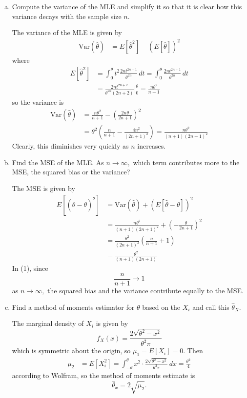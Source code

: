 \documentclass{article}
\newcommand{\var}{\mathrm{Var}}
\begin{document}
\begin{enumerate}
\begin{enumerate}[(a)]
			\item Compute the variance of the MLE and simplify it so that it is clear how this variance decays with the sample size $n.$
				\begin{soln}
					The variance of the MLE is given by 
					\begin{align*}
						\var(\hat{\theta}) &= E[\hat{\theta}^2]-(E[\hat{\theta}])^2 
					\end{align*} where 
					\begin{align*}
						E[\hat{\theta}^2] &= \int_0^\theta t^2 \frac{2nt^{2n-1}}{\theta^{2n}}\, dt = \int_0^\theta \frac{2nt^{2n+1}}{\theta^{2n}}\, dt \\
						&= \frac{2nt^{2n+2}}{\theta^{2n}(2n+2)}\bigg\vert_0^\theta = \frac{n\theta^2}{n+1}
					\end{align*} so the variance is 
					\begin{align*}
					\var(\hat{\theta}) &= \frac{n\theta^2}{n+1}-\left( \frac{2n\theta}{2n+1} \right)^2 \\ 
					&= \theta^2\left( \frac{n}{n+1}-\frac{4n^2}{(2n+1)^2} \right) = \frac{n\theta^2}{(n+1)(2n+1)^2}
					\end{align*} Clearly, this diminishes very quickly as $n$ increases.
					
				\end{soln}

			\item Find the MSE of the MLE. As $n\to\infty,$ which term contributes more to the MSE, the squared bias or the variance?
				\begin{soln}
					The MSE is given by 
					\begin{align*}
						E[(\hat{\theta}-\theta)^2] &= \var(\hat{\theta}) + \left( E[\hat{\theta}-\theta] \right)^2 \\
						&= \frac{n\theta^2}{(n+1)(2n+1)^2} + \left( -\frac{\theta}{2n+1} \right)^2 \\
						&\tag{1}=\frac{\theta^2}{(2n+1)^2}\left( \frac{n}{n+1}+1 \right) \\ 
						&= \frac{\theta^2}{(n+1)(2n+1)}
					\end{align*}
					In (1), since \[\frac{n}{n+1}\to1\] as $n\to\infty,$ the squared bias and the variance contribute equally to the MSE.
					
				\end{soln}

			\item Find a method of moments estimator for $\theta$ based on the $X_i$ and call this $\hat{\theta}_X.$
				\begin{soln}
					The marginal density of $X_i$ is given by \[f_X(x)=\frac{2\sqrt{\theta^2-x^2}}{\theta^2\pi}\] which is symmetric about the origin, so $\mu_1=E[X_i]=0.$ Then
					\begin{align*}
						\mu_2 &= E[X_i^2] = \int_{-\theta}^\theta x^2\cdot\frac{2\sqrt{\theta^2-x^2}}{\theta^2\pi}\, dx = \frac{\theta^2}{4}
					\end{align*} according to Wolfram, so the method of moments estimate is \[\hat{\theta}_x=2\sqrt{\hat{\mu}_2}.\] 
				\end{soln}


\end{enumerate}
\end{enumerate}
\end{document}
